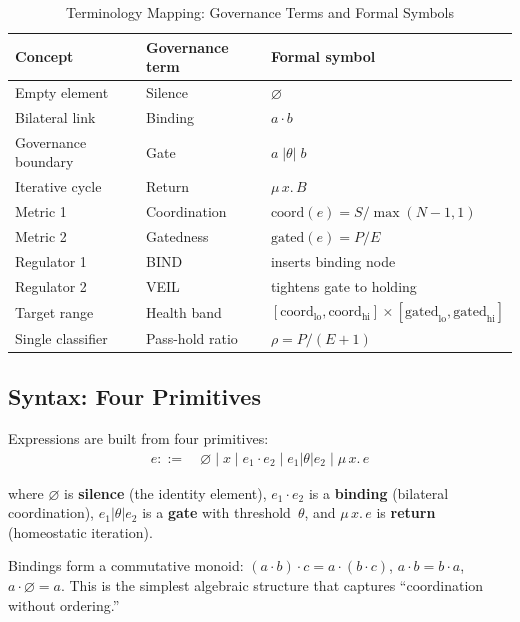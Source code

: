 \documentclass[sigconf,nonacm]{acmart}
\begin{document}
\begin{table}[t]
  \caption{Terminology Mapping: Governance Terms and Formal Symbols}\label{tab:terminology}
  \small
  \begin{tabular}{@{}lll@{}}
    \toprule
    \textbf{Concept} & \textbf{Governance term} & \textbf{Formal symbol} \\
    \midrule
    Empty element      & Silence           & $\varnothing$ \\
    Bilateral link     & Binding           & $a \cdot b$ \\
    Governance boundary& Gate              & $a\;|\theta|\;b$ \\
    Iterative cycle    & Return            & $\mu\, x.\, B$ \\
    Metric 1           & Coordination      & $\mathrm{coord}(e) = S / \max(N{-}1, 1)$ \\
    Metric 2           & Gatedness         & $\mathrm{gated}(e) = P / E$ \\
    Regulator 1        & BIND              & inserts binding node \\
    Regulator 2        & VEIL              & tightens gate to holding \\
    Target range       & Health band       & $[\mathrm{coord}_{\mathrm{lo}}, \mathrm{coord}_{\mathrm{hi}}] \times [\mathrm{gated}_{\mathrm{lo}}, \mathrm{gated}_{\mathrm{hi}}]$ \\
    Single classifier  & Pass-hold ratio   & $\rho = P / (E + 1)$ \\
    \bottomrule
  \end{tabular}
\end{table}

\subsection{Syntax: Four Primitives}

Expressions are built from four primitives:
\begin{align*}
e ::=\ & \varnothing \mid x \mid e_1 \cdot e_2 \mid e_1 \mathbin{|\theta|} e_2 \mid \mu\, x.\, e
\end{align*}

\noindent
where $\varnothing$ is \textbf{silence} (the identity element),
$e_1 \cdot e_2$ is a \textbf{binding} (bilateral coordination),
$e_1 \mathbin{|\theta|} e_2$ is a \textbf{gate} with threshold~$\theta$,
and $\mu\,x.\,e$ is \textbf{return} (homeostatic iteration).

Bindings form a commutative monoid:
$(a \cdot b) \cdot c = a \cdot (b \cdot c)$,
$a \cdot b = b \cdot a$,
$a \cdot \varnothing = a$.
This is the simplest algebraic structure that captures ``coordination
without ordering.''
\end{document}
